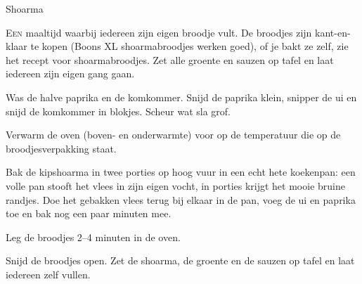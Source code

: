 \begin{recipe}{Shoarma}


\lettrine{E}{en} maaltijd waarbij iedereen zijn eigen broodje vult. De broodjes
zijn kant-en-klaar te kopen (Boons XL shoarmabroodjes werken goed), of je bakt
ze zelf, zie het recept voor shoarmabroodjes. Zet alle groente en sauzen op
tafel en laat iedereen zijn eigen gang gaan.

\begin{ingredients}
\end{ingredients}

\begin{steps}
  \item Was de halve paprika en de komkommer. Snijd de paprika klein, snipper de ui en snijd de komkommer in
        blokjes. Scheur wat sla grof.
  \item Verwarm de oven (boven- en onderwarmte) voor op de temperatuur die op de
        broodjesverpakking staat.
  \item Bak de kipshoarma in twee porties op hoog vuur in een echt hete
        koekenpan: een volle pan stooft het vlees in zijn eigen vocht, in
        porties krijgt het mooie bruine randjes. Doe het gebakken vlees terug
        bij elkaar in de pan, voeg de ui en paprika toe en bak nog een paar
        minuten mee.
  \item Leg de broodjes 2--4 minuten in de oven.
  \item Snijd de broodjes open. Zet de shoarma, de groente en de sauzen op tafel
        en laat iedereen zelf vullen.
\end{steps}
\end{recipe}
